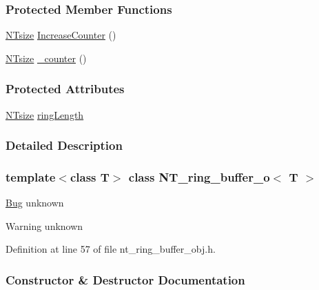 \subsubsection*{Protected Member Functions}
\begin{DoxyCompactItemize}
\item 
\hyperlink{nt__types_8h_a06c124f2e4469769b58230253ce0560b}{NTsize} \hyperlink{class_n_t__ring__buffer__o_a314f3fe40e9fdaf27ecf492c6cdd1428}{IncreaseCounter} ()
\item 
\hyperlink{nt__types_8h_a06c124f2e4469769b58230253ce0560b}{NTsize} \hyperlink{class_n_t__ring__buffer__o_a1022a3bca11f5ef68d0f1593b4dd1649}{\_\-counter} ()
\end{DoxyCompactItemize}
\subsubsection*{Protected Attributes}
\begin{DoxyCompactItemize}
\item 
\hyperlink{nt__types_8h_a06c124f2e4469769b58230253ce0560b}{NTsize} \hyperlink{class_n_t__ring__buffer__o_ad0be2ccb66b4e601eb47d3ea85771bf0}{ringLength}
\end{DoxyCompactItemize}


\subsubsection{Detailed Description}
\subsubsection*{template$<$class T$>$ class NT\_\-ring\_\-buffer\_\-o$<$ T $>$}

\begin{Desc}
\item[\hyperlink{bug__bug000107}{Bug}]unknown \end{Desc}
\begin{DoxyWarning}{Warning}
unknown 
\end{DoxyWarning}


Definition at line 57 of file nt\_\-ring\_\-buffer\_\-obj.h.



\subsubsection{Constructor \& Destructor Documentation}
